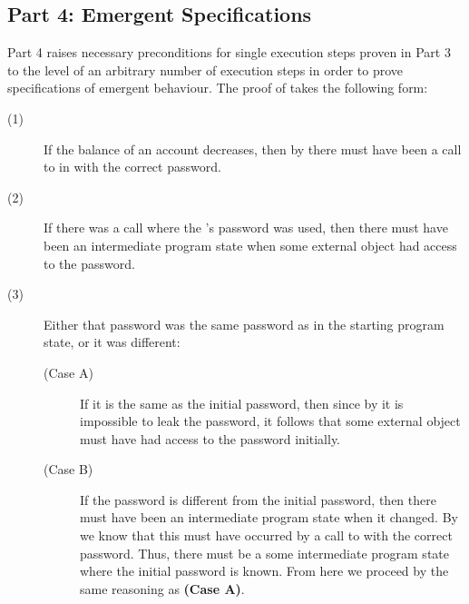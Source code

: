 \subsection{Part 4: Emergent \Nec Specifications}
Part 4 raises necessary preconditions for single execution steps proven in Part 3 to 
the level of an arbitrary number of execution steps in order to prove specifications of emergent behaviour.
The proof of \SrobustB takes the following form:
\begin{description}
\item [(1)]
If the balance of an account decreases, then
by  there must have been a call
to  in  with the correct password.
\item [(2)]
If there was a call where the 's password 
was used, then there must have been an intermediate program state
when some external object had access to the password.
\item [(3)]
Either that password was the same password as in the starting 
program state, or it was different:
\begin{description}
\item [(Case A)]
If it is the same as the initial password, then since by 
it is impossible to leak the password, it follows that some external object 
must have had access to the password initially.
\item [(Case B)]
If the password is different from the initial password, 
then there must have been an intermediate program state when it 
changed. By  we know that this must have occurred
by a call to  with the correct password. Thus,
there must be a some intermediate program state where the initial
password is known. From here we proceed by the same reasoning 
as \textbf{(Case A)}.
\end{description}
\end{description}
